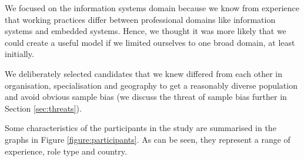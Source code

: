 We focused on the information systems domain because we know from experience that working practices differ between professional domains like information systems and embedded systems.  Hence, we thought it was more likely that we could create a useful model if we limited ourselves to one broad domain, at least initially. 

We deliberately selected candidates that we knew differed from each other in organisation, specialisation and geography to get a reasonably diverse population and avoid obvious sample bias (we discuss the threat of sample bias further in Section \ref{sec:threats}).

Some characteristics of the participants in the study are summarised in the graphs in Figure \ref{figure:participants}.  As can be seen, they represent a range of experience, role type and country.


